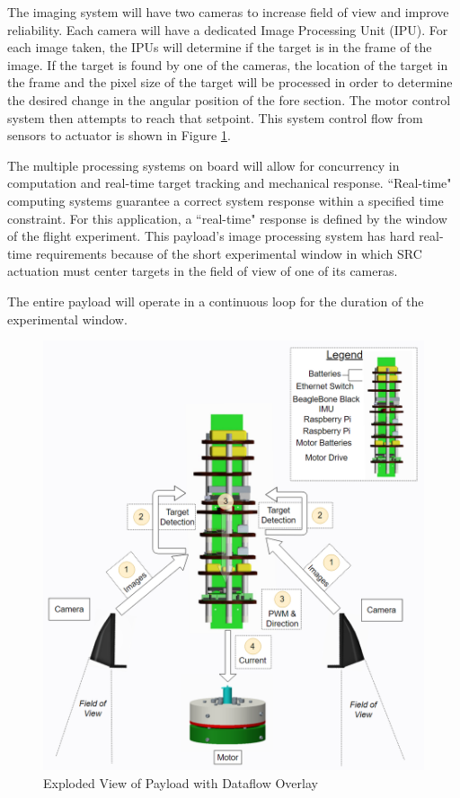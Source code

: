 \documentclass[class=article, crop=false]{standalone}
\begin{document}
	The imaging system will have two cameras to increase field of view and improve reliability. Each camera will have a dedicated Image Processing Unit (IPU). For each image taken, the IPUs will determine if the target is in the frame of the image. If the target is found by one of the cameras, the location of the target in the frame and the pixel size of the target will be processed in order to determine the desired change in the angular position of the fore section. The motor control system then attempts to reach that setpoint. This system control flow from sensors to actuator is shown in Figure \ref{fig:payloadWOO}.
	
	\bigbreak
	
	The multiple processing systems on board will allow for concurrency in computation and real-time target tracking and mechanical response. ``Real-time" computing systems guarantee a correct system response within a specified time constraint. For this application, a ``real-time" response is defined by the window of the flight experiment. This payload's image processing system has hard real-time requirements because of the short experimental window in which SRC actuation must center targets in the field of view of one of its cameras.
	
	\bigbreak
	
	The entire payload will operate in a continuous loop for the duration of the experimental window.
	
	\bigbreak
	
	\FloatBarrier
	\begin{figure}[!h]
		\centering
		\includegraphics[width=0.85\linewidth]{09_Figures/Payload/payloadWOO.png}
		\caption{Exploded View of Payload with Dataflow Overlay}
		\label{fig:payloadWOO}
	\end{figure}
	\FloatBarrier
	
\end{document}
